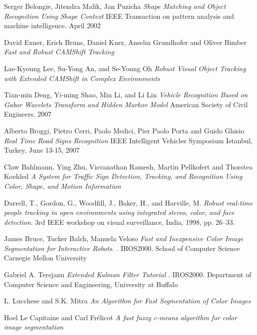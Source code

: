 \documentclass[11pt, oneside]{book} %
\begin{document}
\begin{thebibliography}{9}
 Serger Belongie, Jitendra Malik, Jan Puzicha \textit{Shape Matching and Object Recognition Using Shape Context} IEEE Transaction on pattern analysis and machine intelligence. April 2002

 David Exner, Erich Bruns, Daniel Kurz, Anselm Grundhofer and Oliver Bimber  \textit{Fast and Robust CAMShift Tracking}

 Lae-Kyoung Lee, Su-Yong An, and Se-Young Oh  \textit{ Robust Visual Object Tracking with Extended CAMShift in Complex Environments}
 
 Tian-min Deng, Yi-ming Shao, Min Li, and Li Lin \textit{Vehicle Recognition Based on Gabor Wavelets Transform and Hidden Markov Model} American Society of Civil Engineers. 2007
 
 Alberto Broggi, Pietro Cerri, Paolo Medici, Pier Paolo Porta and Guido Ghisio  \textit{Real Time Road Signs Recognition} IEEE Intelligent Vehicles Symposium Istanbul, Turkey, June 13-15, 2007

 Claw Bahlmann, Ying Zhu, Visvanathan Ramesh, Martin Pellkofert and Thorstea Koehled  \textit{A System for Traffic Sign Detection, Tracking, and 	Recognition Using Color, Shape, and Motion Information}

 Darrell, T., Gordon, G., Woodﬁll, J., Baker, H., and Harville, M. \textit{Robust real-time people tracking in open environments using integrated stereo, color, and face detection}. 3rd IEEE workshop on visual surveillance, India, 1998, pp. 26–33.

 James Bruce, Tucker Balch, Manuela Veloso  \textit{Fast and Inexpensive Color Image Segmentation for Interactive Robots.} . IROS2000. School of Computer Science Carnegie Mellon University

 Gabriel A. Terejanu \textit{Extended Kalman Filter Tutorial} . IROS2000. Department of Computer Science and Engineering, University at Buffalo

 L. Lucchese and S.K. Mitra \textit{An Algorithm for Fast Segmentation of Color Images}

 Hoel Le Capitaine and Carl Frélicot \textit{A fast fuzzy c-means algorithm for color image segmentation}


\end{thebibliography}
\end{document}
